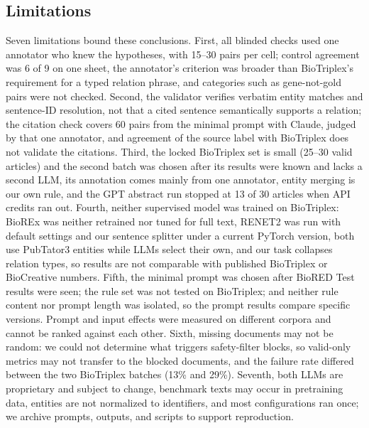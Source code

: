 \documentclass[preprint,10pt,letterpaper]{elsarticle}
\begin{document}
\subsection{Limitations}\label{sec:limitations}
Seven limitations bound these conclusions. First, all blinded checks used one annotator who knew the hypotheses, with 15--30 pairs per cell; control agreement was 6 of 9 on one sheet, the annotator's criterion was broader than BioTriplex's requirement for a typed relation phrase, and categories such as gene-not-gold pairs were not checked. Second, the validator verifies verbatim entity matches and sentence-ID resolution, not that a cited sentence semantically supports a relation; the citation check covers 60 pairs from the minimal prompt with Claude, judged by that one annotator, and agreement of the source label with BioTriplex does not validate the citations. Third, the locked BioTriplex set is small (25--30 valid articles) and the second batch was chosen after its results were known and lacks a second LLM, its annotation comes mainly from one annotator, entity merging is our own rule, and the GPT abstract run stopped at 13 of 30 articles when API credits ran out. Fourth, neither supervised model was trained on BioTriplex: BioREx was neither retrained nor tuned for full text, RENET2 was run with default settings and our sentence splitter under a current PyTorch version, both use PubTator3 entities while LLMs select their own, and our task collapses relation types, so results are not comparable with published BioTriplex or BioCreative numbers. Fifth, the minimal prompt was chosen after BioRED Test results were seen; the rule set was not tested on BioTriplex; and neither rule content nor prompt length was isolated, so the prompt results compare specific versions. Prompt and input effects were measured on different corpora and cannot be ranked against each other. Sixth, missing documents may not be random: we could not determine what triggers safety-filter blocks, so valid-only metrics may not transfer to the blocked documents, and the failure rate differed between the two BioTriplex batches (13\% and 29\%). Seventh, both LLMs are proprietary and subject to change, benchmark texts may occur in pretraining data, entities are not normalized to identifiers, and most configurations ran once; we archive prompts, outputs, and scripts to support reproduction.

\end{document}
